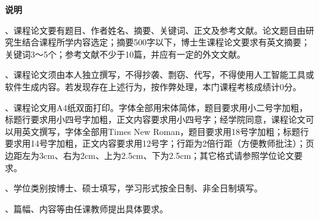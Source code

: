 \clearpage
\thispagestyle{empty}
\vspace*{1.2em}
\begin{center}
{\songti\bfseries\fontsize{16pt}{22pt}\selectfont 说\hspace{1em}明}
\end{center}
\vspace{1.2em}
{\songti\fontsize{15pt}{22.5pt}\selectfont
\setlength{\parindent}{2em}
、课程论文要有题目、作者姓名、摘要、关键词、正文及参考文献。论文题目由研究生结合课程所学内容选定；摘要500字以下，博士生课程论文要求有英文摘要；关键词3～5个；参考文献不少于10篇，并应有一定的外文文献。

、课程论文须由本人独立撰写，不得抄袭、剽窃、代写，不得使用人工智能工具或软件生成内容。若发现存在上述行为，按作弊处理，本门课程考核成绩计0分。

、课程论文用A4纸双面打印。字体全部用宋体简体，题目要求用小二号字加粗，标题行要求用小四号字加粗，正文内容要求用小四号字；经学院同意，课程论文可以用英文撰写，字体全部用Times New Roman，题目要求用18号字加粗；标题行要求用14号字加粗，正文内容要求用12号字；行距为2倍行距（方便教师批注）；页边距左为3cm、右为2cm、上为2.5cm、下为2.5cm；其它格式请参照学位论文要求。

、学位类别按博士、硕士填写，学习形式按全日制、非全日制填写。

、篇幅、内容等由任课教师提出具体要求。
}
\clearpage
\RenewCommandCopy{\CJKecglue}{\coveroldCJKecglue}
\restoregeometry
\linespread{2}\selectfont
\pagestyle{fancy}
